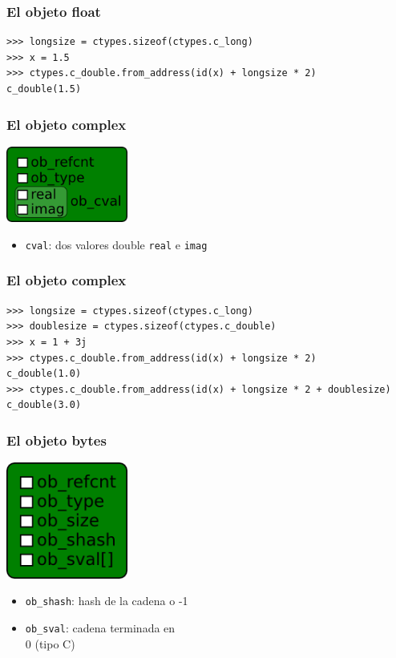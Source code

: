 \documentclass[10pt]{beamer}
\begin{document}
  \begin{frame}[containsverbatim]
    \frametitle{El objeto float}
    \begin{verbatim}
>>> longsize = ctypes.sizeof(ctypes.c_long)
>>> x = 1.5
>>> ctypes.c_double.from_address(id(x) + longsize * 2)
c_double(1.5)
    \end{verbatim}
  \end{frame}

  \begin{frame}[containsverbatim]
    \frametitle{El objeto complex}
    \begin{center}\includegraphics[width=4cm]{img/Complex.png}\end{center}
    \begin{itemize}
      \item \verb+cval+: dos valores double \verb+real+ e \verb+imag+
    \end{itemize}
  \end{frame}

  \begin{frame}[containsverbatim]
    \frametitle{El objeto complex}
    \begin{verbatim}
>>> longsize = ctypes.sizeof(ctypes.c_long)
>>> doublesize = ctypes.sizeof(ctypes.c_double)
>>> x = 1 + 3j
>>> ctypes.c_double.from_address(id(x) + longsize * 2)
c_double(1.0)
>>> ctypes.c_double.from_address(id(x) + longsize * 2 + doublesize)
c_double(3.0)
    \end{verbatim}
  \end{frame}

  \begin{frame}[containsverbatim]
    \frametitle{El objeto bytes}
    \begin{center}\includegraphics[width=4cm]{img/Bytes.png}\end{center}
    \begin{itemize}
      \item \verb+ob_shash+: hash de la cadena o -1
      \item \verb+ob_sval+: cadena terminada en \\0 (tipo C)
    \end{itemize}
  \end{frame}
\end{document}
